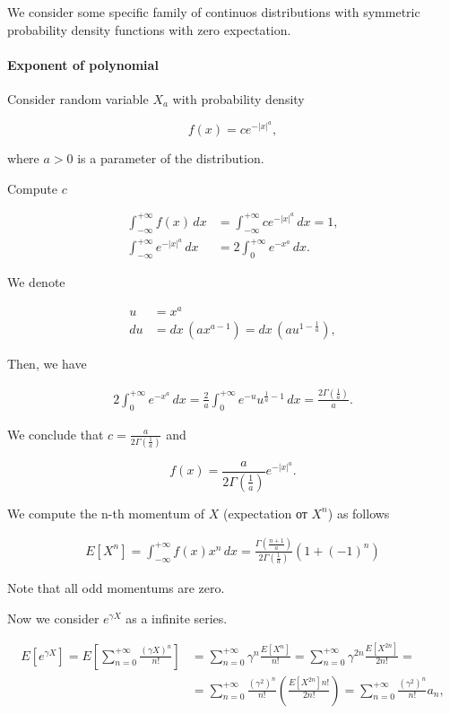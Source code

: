 \documentclass[12pt, a4paper]{article}
\theoremstyle{remark}
\newcommand{\expx}[1]{e^{-|x|^{#1}}}
\newcommand{\expxpoz}[1]{e^{-x^{#1}}}
\newcommand{\infint}[1]{\int_{-\infty}^{+\infty} #1 \, dx}
\newcommand{\infintpoz}[1]{\int_{0}^{+\infty} #1 \, dx}
\begin{document}
We consider some specific family of continuos distributions with symmetric probability density functions with zero expectation.

\paragraph*{Exponent of polynomial}

\hfill

\hfill

Consider random variable \(X_a\) with probability density

$$f(x) = c \expx{a},$$

where \(a > 0\) is a parameter of the distribution.

Compute $c$

\begin{align*}
    \infint{f(x)} & = \infint{c\expx{a}} = 1, \\
    \infint{\expx{a}} & = 2\infintpoz{\expxpoz{a}}.
\end{align*}

We denote

\begin{align*}
    u  & = x^a                                              \\
    du & = dx\,(a x^{a - 1}) = dx\,(a u^{1 - \frac{1}{a}}),
\end{align*}

Then, we have

\begin{align*}
    2\infintpoz{\expxpoz{a}} = \frac{2}{a} \infintpoz{e^{-u}u^{\frac{1}{a} - 1}} = \frac{2\Gamma(\frac{1}{a})}{a}.
\end{align*}

We conclude that $c = \frac{a}{2\Gamma(\frac{1}{a})}
$ and

$$f(x) = \frac{a}{2\Gamma(\frac{1}{a})} \expx{a}.$$

We compute the n-th momentum of $X$ (expectation от $X^n$) as follows

\begin{align*}
    E[X^n] = \infint{f(x) x^n} = \frac{\Gamma(\frac{n + 1}{a})}{2\Gamma(\frac{1}{a})} (1 + (-1)^n)
\end{align*}

Note that all odd momentums are zero. 

Now we consider $e^{\gamma X}$ as a infinite series.

\begin{align*}
    E[e^{\gamma X}] = E\left[\sum_{n = 0}^{+\infty}\frac{(\gamma X)^n}{n!}\right] & = \sum_{n = 0}^{+\infty}\gamma^n\frac{E[X^n]}{n!} = \sum_{n = 0}^{+\infty}\gamma^{2n}\frac{E[X^{2n}]}{2n!} =                                \\
    & = \sum_{n = 0}^{+\infty}\frac{(\gamma^2)^{n}}{n!}\left(\frac{E[X^{2n}]n!}{2n!}\right) = \sum_{n = 0}^{+\infty}\frac{(\gamma^2)^{n}}{n!} a_n,
\end{align*}
\end{document}
